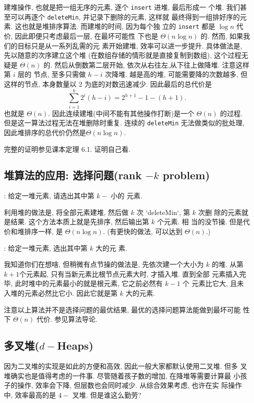 \documentclass[a4paper]{ctexart}
\theoremstyle{definition}
\theoremstyle{definition}
\begin{document}

建堆操作, 也就是把一组无序的元素, 逐个 \verb|insert| 进堆, 最后形成一
个堆. 我们甚至可以再逐个 \verb|deleteMin|, 并记录下删除的元素, 这样就
最终得到一组排好序的元素. 这也就是堆排序算法. 而建堆的时间, 因为每个独
立的 \verb|insert| 都是 $\log n$ 代价, 因此即便只考虑最后一层, 在最坏可能性
下也是 $\Theta(n \log n)$ 的. 然而, 如果我们的目标只是从一系列乱需的元
素开始建堆, 效率可以进一步提升. 具体做法是, 先以随意的次序建立这个堆
(在数组存储的情形就是直接复制到数组), 这个过程无疑是 $\Theta(n)$ 的.
然后从倒数第二层开始, 依次从右往左,从下往上做降堆. 注意这样第 $i$ 层的
节点, 至多只需做 $h - i$ 次降堆. 越是高的堆, 可能需要降的次数越多, 但
这样的节点, 本身数量以 $2$ 为底的对数迅速减少. 因此最后的总代价是
$$ 
\sum_{i = 1}^h 2^i(h - i) =
2^{h + 1} - 1 - (h + 1).
$$
也就是 $\Theta(n)$. 因此连续建堆(中间不能有其他操作打断)是一个
$\Theta(n)$ 的过程. 但是这一算法过程无法在堆删除时重复. 连续的
\verb|deleteMin| 无法做类似的批处理, 因此堆排序的总代价仍然是$\Theta(n
\log n)$.

完整的证明参见课本定理 6.1. 证明自己看.

\subsection{堆算法的应用: 选择问题(rank $-k$ problem) }

: 给定一堆元素, 请选出其中第 $k-$ 小的
元素.

利用堆的做法是, 将全部元素建堆, 然后做 $k$ 次 `deleteMin`, 第 $k$ 次删
除的元素就是结果. 这个方法本质上就是先排序, 然后输出第 $k$ 个元素. 相
当的没节操. 但是代价和堆排序一样, 是 $\Theta(n \log n)$. (有更快的做法,
可以达到 $\Theta(n)$.)

: 给定一堆元素, 选出其中第 $k$ 大的元
素.

我知道你们在想啥, 但稍微有点节操的做法是, 先依次建一个大小为 $k$ 的堆.
从第 $k + 1$个元素起, 只有当新元素比根节点元素大时, 才插入堆. 直到全部
元素插入完毕, 此时堆中的元素最小的就是根元素, 它之前必然有 $k - 1$ 个
元素比它大, 且未入堆的元素必然比它小. 因此它就是第 $k$ 大的元素.

注意以上算法并不是选择问题的最优结果, 最优的选择问题算法能做到最坏可能
性下 $\Theta(n)$ 代价. 参见算法导论. 

\subsection{多叉堆($d-$Heaps)}
因为二叉堆的实现是如此的方便和高效, 因此一般大家都默认使用二叉堆. 但多
叉堆确实也是值得考虑的一件事. 尽管随着孩子数的增加, 在降堆等需要计算最
小孩子的操作, 效率会下降, 但层数也会同时减少. 从综合效果考虑, 也许在实
际操作中, 效率最高的是 $4-$ 叉堆. 但是谁这么勤劳?
\end{document}
